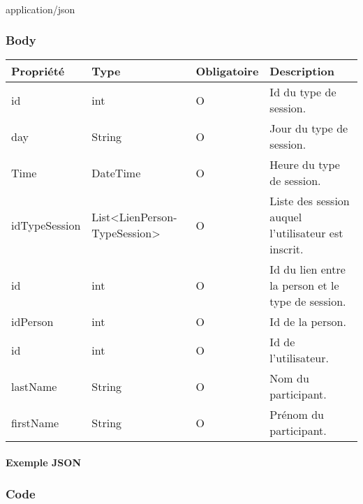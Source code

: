 		\paragraph{}
			application/json
	
	\subsubsection{Body}
		\begin{center}
			\begin{tabularx}{\textwidth}{| T{0.2122\textwidth} | S{0.22\textwidth} | S{0.15\textwidth} | S{0.3\textwidth} |}
				\hline
				Propriété & Type & Obligatoire & Description \\
				\hline
				id & int & O & Id du type de session. \\
				\hline
				day & String & O & Jour du type de session. \\
				\hline
				Time & DateTime & O & Heure du type de session. \\
				\hline
				idTypeSession & List<LienPerson- TypeSession> & O & Liste des session auquel l'utilisateur est inscrit. \\
				\hline
				
				\hline
				
				\hline
				id & int & O & Id du lien entre la person et le type de session. \\ 
				\hline
				idPerson & int & O & Id de la person. \\
				\hline
				
				\hline
				
				\hline
				id & int & O & Id de l'utilisateur. \\
				\hline
				lastName & String & O & Nom du participant. \\
				\hline
				firstName & String & O & Prénom du participant. \\
				\hline

			\end{tabularx}
		\end{center}
		
	\newpage
		\paragraph{Exemple JSON}
			\paragraph{}
			
			
			
	\subsubsection{Code}
		\paragraph{}
